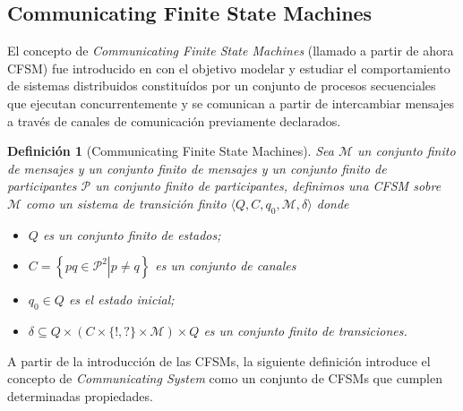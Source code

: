 \documentclass[paper=a4, fontsize=11pt, spanish]{scrartcl} %
\numberwithin{equation}{section} %
\numberwithin{figure}{section} %
\numberwithin{table}{section} %
\newtheorem{definition}{Definición}
\begin{document}
\subsection{Communicating Finite State Machines}

El concepto de \emph{Communicating Finite State Machines} (llamado a partir de ahora CFSM) fue introducido en \cite{CFSM} con el objetivo modelar y estudiar el comportamiento de sistemas distribuidos constituídos por un conjunto de procesos secuenciales que ejecutan concurrentemente y se comunican a partir de intercambiar mensajes a través de canales de comunicación previamente declarados.

\begin{definition}[Communicating Finite State Machines] Sea $\mathcal{M}$ un conjunto finito de mensajes y un conjunto finito de mensajes  y un conjunto finito de participantes $\mathcal{P}$ un conjunto finito de participantes, definimos una CFSM sobre $\mathcal{M}$ como un sistema de transición finito $\langle Q, C, q_0, \mathcal{M}, \delta \rangle$ donde
\begin{itemize}
  \item $Q$ es un conjunto finito de estados;
  \item $C = \left\{ pq \in \mathcal{P}^2 \left|\right. p \not= q\right\}$ es un conjunto de canales
  \item $q_0 \in Q$ es el estado inicial;
  \item $\delta \subseteq Q \times (C \times \{!,?\} \times \mathcal{M}) \times Q$ es un conjunto finito de \emph{transiciones}.
  \end{itemize}
  
\end{definition} 

A partir de la introducción de las CFSMs, la siguiente definición introduce el concepto de \emph{Communicating System} \cite[Def.2.2]{Communicating System} como un conjunto de CFSMs que cumplen determinadas propiedades.
\end{document}
